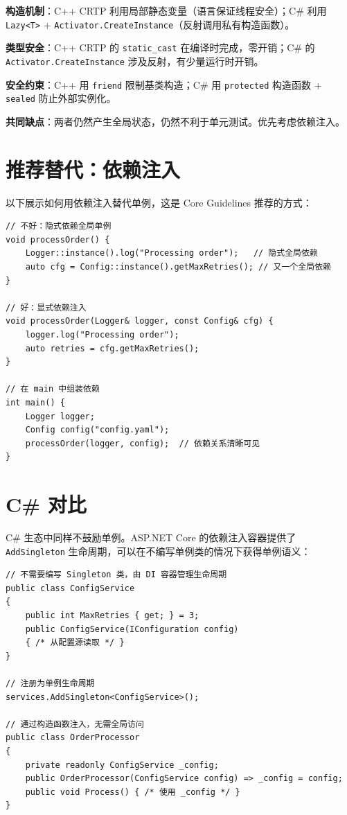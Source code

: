 \documentclass[12pt,a4paper,fontset=fandol]{ctexbook}
\begin{document}
\begin{compare}[title={CRTP vs 自引用泛型 Singleton}]
\textbf{构造机制}：C++ CRTP 利用局部静态变量（语言保证线程安全）；C\# 利用 \texttt{Lazy<T>} + \texttt{Activator.CreateInstance}（反射调用私有构造函数）。

\textbf{类型安全}：C++ CRTP 的 \texttt{static\_\allowbreak{}cast} 在编译时完成，零开销；C\# 的 \texttt{Activator.\allowbreak{}Create\allowbreak{}Instance} 涉及反射，有少量运行时开销。

\textbf{安全约束}：C++ 用 \texttt{friend} 限制基类构造；C\# 用 \texttt{protected} 构造函数 + \texttt{sealed} 防止外部实例化。

\textbf{共同缺点}：两者仍然产生全局状态，仍然不利于单元测试。优先考虑依赖注入。
\end{compare}

\section{推荐替代：依赖注入}

以下展示如何用依赖注入替代单例，这是 Core Guidelines 推荐的方式：

\begin{lstlisting}[style=cppstyle, caption={用依赖注入替代单例}]
// 不好：隐式依赖全局单例
void processOrder() {
    Logger::instance().log("Processing order");   // 隐式全局依赖
    auto cfg = Config::instance().getMaxRetries(); // 又一个全局依赖
}

// 好：显式依赖注入
void processOrder(Logger& logger, const Config& cfg) {
    logger.log("Processing order");
    auto retries = cfg.getMaxRetries();
}

// 在 main 中组装依赖
int main() {
    Logger logger;
    Config config("config.yaml");
    processOrder(logger, config);  // 依赖关系清晰可见
}
\end{lstlisting}

\section{C\# 对比}

C\# 生态中同样不鼓励单例。ASP.NET Core 的依赖注入容器提供了 \texttt{AddSingleton} 生命周期，可以在不编写单例类的情况下获得单例语义：

\begin{lstlisting}[style=csharpstyle, caption={C\# 依赖注入替代单例}]
// 不需要编写 Singleton 类，由 DI 容器管理生命周期
public class ConfigService
{
    public int MaxRetries { get; } = 3;
    public ConfigService(IConfiguration config)
    { /* 从配置源读取 */ }
}

// 注册为单例生命周期
services.AddSingleton<ConfigService>();

// 通过构造函数注入，无需全局访问
public class OrderProcessor
{
    private readonly ConfigService _config;
    public OrderProcessor(ConfigService config) => _config = config;
    public void Process() { /* 使用 _config */ }
}
\end{lstlisting}
\end{document}
